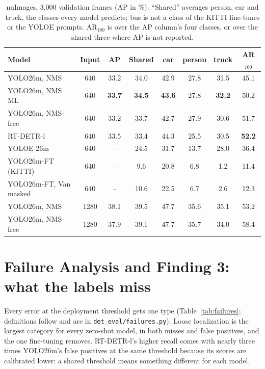 \documentclass[conference]{IEEEtran}
\begin{document}
\begin{table}[t]
\centering
\caption{nuImages, 3{,}000 validation frames (AP in \%). ``Shared'' averages person, car and truck, the classes
every model predicts; bus is not a class of the KITTI fine-tunes or the YOLOE prompts. AR$_{100}$ is over the AP
column's four classes, or over the shared three where AP is not reported.}
\label{tab:nuimages}
\scriptsize
\setlength{\tabcolsep}{2.5pt}
\begin{tabular}{@{}lccccccc@{}}
\toprule
Model & Input & AP & Shared & car & person & truck & AR$_{100}$ \\
\midrule
YOLO26m, NMS & 640 & 33.2 & 34.0 & 42.9 & 27.8 & 31.5 & 45.1 \\
YOLO26m, NMS ML & 640 & \textbf{33.7} & \textbf{34.5} & \textbf{43.6} & 27.8 & \textbf{32.2} & 50.2 \\
YOLO26m, NMS-free & 640 & 33.2 & 33.7 & 42.7 & 27.9 & 30.6 & 51.7 \\
RT-DETR-l & 640 & 33.5 & 33.4 & 44.3 & 25.5 & 30.5 & \textbf{52.2} \\
YOLOE-26m & 640 & -- & 24.5 & 31.7 & 13.7 & 28.0 & 36.4 \\
YOLO26m-FT (KITTI) & 640 & -- & 9.6 & 20.8 & 6.8 & 1.2 & 11.4 \\
YOLO26m-FT, Van masked & 640 & -- & 10.6 & 22.5 & 6.7 & 2.6 & 12.3 \\
\midrule
YOLO26m, NMS & 1280 & 38.1 & 39.5 & 47.7 & 35.6 & 35.1 & 53.2 \\
YOLO26m, NMS-free & 1280 & 37.9 & 39.1 & 47.7 & 35.7 & 34.0 & 58.4 \\
\bottomrule
\end{tabular}
\end{table}

\section{Failure Analysis and Finding 3: what the labels miss}\label{sec:failures}
Every error at the deployment threshold gets one type (Table~\ref{tab:failures}; definitions follow
\cite{hoiem2012diagnosing,bolya2020tide} and are in \texttt{det\_eval/failures.py}). Loose localization is the largest
category for every zero-shot model, in both misses and false positives, and the one fine-tuning removes. RT-DETR-l's
higher recall comes with nearly three times YOLO26m's false positives at the same threshold because its scores are
calibrated lower: a shared threshold means something different for each model.
\end{document}
